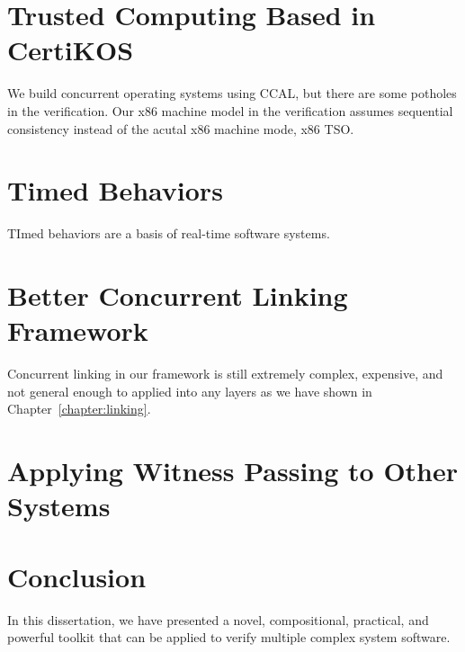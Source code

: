 \section{Trusted Computing Based in CertiKOS}
\label{chapter:conclusion:sec:trusted-computing-based-in-certikos}

We build concurrent operating systems using CCAL, but there are some potholes in the verification. 
Our x86 machine model in the verification assumes sequential consistency instead of the acutal x86 machine mode, x86 TSO.

\section{Timed Behaviors}
\label{chapter:conclusion:sec:timed-behaviors}
TImed behaviors are a basis of real-time software systems.

\section{Better Concurrent Linking Framework}
\label{chapter:conclusion:sec:better-concurrent-linking-framework}

Concurrent linking in our framework is still extremely complex, expensive, and not general enough to applied into any layers as we have shown in Chapter~\ref{chapter:linking}.  


\section{Applying Witness Passing to Other Systems}
\label{chapter:conclusion:sec:applying-witness-passing-to-other-systems}



\section{Conclusion}
\label{chapter:conclusion:sec:conclusion}

In this dissertation, we have presented a novel, compositional, practical, and powerful toolkit that can be applied to verify multiple complex system software. 
